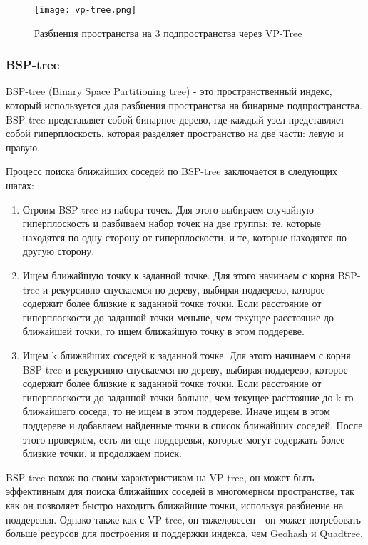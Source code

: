 \begin{figure}[h]
    \centering
    \texttt{[image: vp-tree.png]}
    \caption{Разбиения пространства на 3 подпространства через VP-Tree}
\end{figure}

\subsubsection{BSP-tree}
BSP-tree (Binary Space Partitioning tree) - это пространственный индекс, который используется для разбиения пространства на бинарные подпространства. BSP-tree представляет собой бинарное дерево, где каждый узел представляет собой гиперплоскость, которая разделяет пространство на две части: левую и правую.

Процесс поиска ближайших соседей по BSP-tree заключается в следующих шагах:
\begin{enumerate}
    \item Строим BSP-tree из набора точек. Для этого выбираем случайную гиперплоскость и разбиваем набор точек на две группы: те, которые находятся по одну сторону от гиперплоскости, и те, которые находятся по другую сторону.
    \item Ищем ближайшую точку к заданной точке. Для этого начинаем с корня BSP-tree и рекурсивно спускаемся по дереву, выбирая поддерево, которое содержит более близкие к заданной точке точки. Если расстояние от гиперплоскости до заданной точки меньше, чем текущее расстояние до ближайшей точки, то ищем ближайшую точку в этом поддереве.
    \item Ищем k ближайших соседей к заданной точке. Для этого начинаем с корня BSP-tree и рекурсивно спускаемся по дереву, выбирая поддерево, которое содержит более близкие к заданной точке точки. Если расстояние от гиперплоскости до заданной точки больше, чем текущее расстояние до k-го ближайшего соседа, то не ищем в этом поддереве. Иначе ищем в этом поддереве и добавляем найденные точки в список ближайших соседей. После этого проверяем, есть ли еще поддеревья, которые могут содержать более близкие точки, и продолжаем поиск.
\end{enumerate}

BSP-tree похож по своим характеристикам на VP-tree, он может быть эффективным для поиска ближайших соседей в многомерном пространстве, так как он позволяет быстро находить ближайшие точки, используя разбиение на поддеревья. Однако также как с VP-tree, он тяжеловесен - он может потребовать больше ресурсов для построения и поддержки индекса, чем Geohash и Quadtree.

